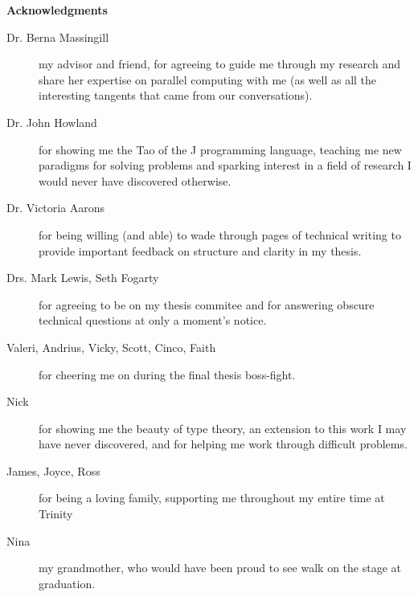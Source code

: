 \begin{center}

\bigskip

\begin{Large}
\textbf{Acknowledgments}
\end{Large}

\bigskip

\end{center}

\begin{description}
	\item[Dr. Berna Massingill] my advisor and friend, for agreeing to guide me through my research and 
		share her expertise on parallel computing with me (as well as all the interesting tangents that came from our conversations).
	\item[Dr. John Howland] for showing me the Tao of the J programming language, 
		teaching me new paradigms for solving problems and 
		sparking interest in a field of research I would never have discovered otherwise.
	\item[Dr. Victoria Aarons] for being willing (and able) to wade through pages of technical writing 
		to provide important feedback on structure and clarity in my thesis. 
	\item[Drs. Mark Lewis, Seth Fogarty] for agreeing to be on my thesis commitee and 
		for answering obscure technical questions at only a moment's notice.
	\item[Valeri, Andrius, Vicky, Scott, Cinco, Faith] for cheering me on during the final thesis boss-fight.
	\item[Nick] for showing me the beauty of type theory, an extension to this work I may have never discovered, 
		and for helping me work through difficult problems.
	\item[James, Joyce, Ross] for being a loving family, supporting me throughout my entire time at Trinity
	\item[Nina] my grandmother, who would have been proud to see walk on the stage at graduation.
\end{description}
